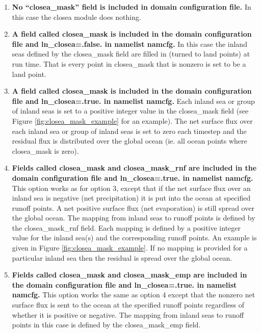 \documentclass[../main/NEMO_manual]{subfiles}
\begin{document}
\begin{enumerate}
\item{{\bf No ``closea\_mask'' field is included in domain configuration
  file.} In this case the closea module does nothing.}

\item{{\bf A field called closea\_mask is included in the domain
configuration file and ln\_closea=.false. in namelist namcfg.} In this
case the inland seas defined by the closea\_mask field are filled in
(turned to land points) at run time. That is every point in
closea\_mask that is nonzero is set to be a land point.}

\item{{\bf A field called closea\_mask is included in the domain
configuration file and ln\_closea=.true. in namelist namcfg.} Each
inland sea or group of inland seas is set to a positive integer value
in the closea\_mask field (see Figure \ref{fig:closea_mask_example}
for an example). The net surface flux over each inland sea or group of
inland seas is set to zero each timestep and the residual flux is
distributed over the global ocean (ie. all ocean points where
closea\_mask is zero).}

\item{{\bf Fields called closea\_mask and closea\_mask\_rnf are
included in the domain configuration file and ln\_closea=.true. in
namelist namcfg.} This option works as for option 3, except that if
the net surface flux over an inland sea is negative (net
precipitation) it is put into the ocean at specified runoff points. A
net positive surface flux (net evaporation) is still spread over the
global ocean. The mapping from inland seas to runoff points is defined
by the closea\_mask\_rnf field. Each mapping is defined by a positive
integer value for the inland sea(s) and the corresponding runoff
points. An example is given in Figure
\ref{fig:closea_mask_example}. If no mapping is provided for a
particular inland sea then the residual is spread over the global
ocean.}

\item{{\bf Fields called closea\_mask and closea\_mask\_emp are
included in the domain configuration file and ln\_closea=.true. in
namelist namcfg.} This option works the same as option 4 except that
the nonzero net surface flux is sent to the ocean at the specified
runoff points regardless of whether it is positive or negative. The
mapping from inland seas to runoff points in this case is defined by
the closea\_mask\_emp field.}
\end{enumerate}
\end{document}

